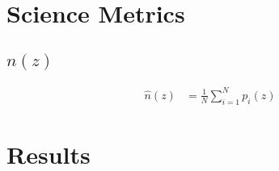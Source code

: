 \documentclass[\docopts]{\docclass}
\begin{document}




\section{Science Metrics}
\label{sec:science}



\subsection{$n(z)$}
\label{sec:nz}

\begin{align}
\hat{n}(z) &= \frac{1}{N}\sum_{i=1}^{N}p_{i}(z)
\label{eq:nz}
\end{align}






\section{Results}
\label{sec:results}
\end{document}
